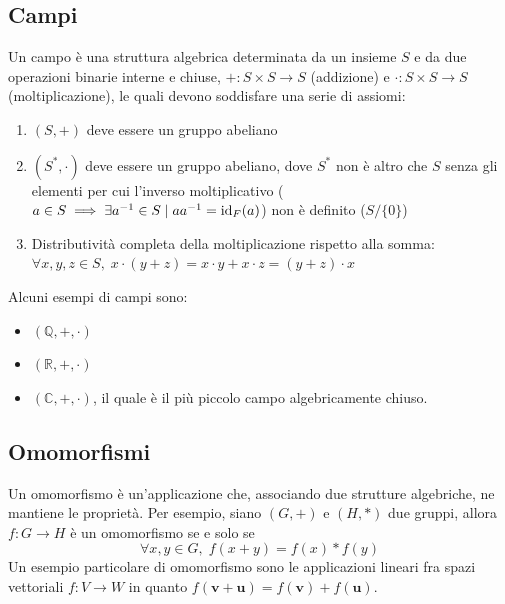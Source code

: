 \documentclass{article}
\begin{document}
\subsection{Campi} \label{subsec:fields}
    Un campo è una struttura algebrica determinata da un insieme $S$ e da due operazioni binarie interne e chiuse, $+ : S \times S \rightarrow S$ (addizione)  e $\cdot : S \times S \rightarrow S$ (moltiplicazione), le quali devono soddisfare una serie di assiomi:
    \begin{enumerate}[label=(\arabic*)]
        \item $(S, +)$ deve essere un gruppo abeliano 
        \item $(S^*, \cdot)$ deve essere un gruppo abeliano, dove $S^*$ non è altro che $S$ senza gli elementi per cui l'inverso moltiplicativo ($a \in S \implies \exists a^{-1} \in S \; | \; aa^{-1} = \textnormal{id}_{F}(a)$) non è definito ($S / \{0\}$)
        \item Distributività completa della moltiplicazione rispetto alla somma: $\forall x, y, z \in S, \; x \cdot (y + z) = x \cdot y + x \cdot z = (y + z) \cdot x$
    \end{enumerate}

    \vspace{10pt}
    Alcuni esempi di campi sono:
    \begin{itemize}
        \item $(\mathbb{Q}, +, \cdot)$ 
        \item $(\mathbb{R}, +, \cdot)$ 
        \item $(\mathbb{C}, +, \cdot)$, il quale è il più piccolo campo algebricamente chiuso.
    \end{itemize}



\subsection{Omomorfismi} \label{subsec:homomorphisms}
    Un omomorfismo è un'applicazione che, associando due strutture algebriche, ne mantiene le proprietà.
    Per esempio, siano $(G, +)$ e $(H, *)$ due gruppi,
    allora $f: G \rightarrow H$ è un omomorfismo se e solo se 
    \[
        \forall x, y \in G, \; f(x + y) = f(x) * f(y)
    \]
    Un esempio particolare di omomorfismo sono le applicazioni lineari fra spazi vettoriali $f: V \rightarrow W$ in quanto $f(\mathbf{v} + \mathbf{u}) = f(\mathbf{v}) + f(\mathbf{u})$.
\end{document}
